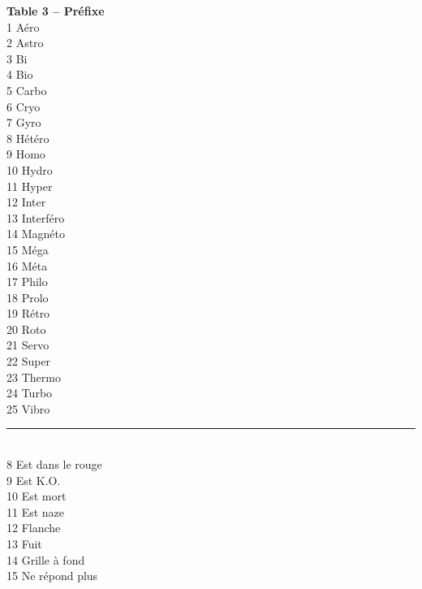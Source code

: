 \documentclass[11pt,twoside,a4paper]{article}
\begin{document}
\begin{table}[ht]
\begin{multicols}{5}
{\textbf{Table 3 -- Pr{\'e}fixe}~\\
1	A{\'e}ro~\\
2	Astro~\\
3	Bi~\\
4	Bio~\\
5	Carbo~\\
6	Cryo~\\
7	Gyro~\\
8	H{\'e}t{\'e}ro~\\
9	Homo~\\
10	Hydro~\\
11	Hyper~\\
12	Inter~\\
13	Interf{\'e}ro~\\
14	Magn{\'e}to~\\
15	M{\'e}ga~\\
16	M{\'e}ta~\\
17	Philo~\\
18	Prolo~\\
19	R{\'e}tro~\\
20	Roto~\\
21	Servo~\\
22	Super~\\
23	Thermo~\\
24	Turbo~\\
25	Vibro~\\

\rule{0.15\textwidth}{0.05cm}~\\

8	Est dans le rouge~\\
9	Est K.O.~\\
10	Est mort~\\
11	Est naze~\\
12	Flanche~\\
13	Fuit~\\
14	Grille {\`a} fond~\\
15	Ne r{\'e}pond plus~\\

\columnbreak

}
\end{multicols}
\end{table}
\end{document}
